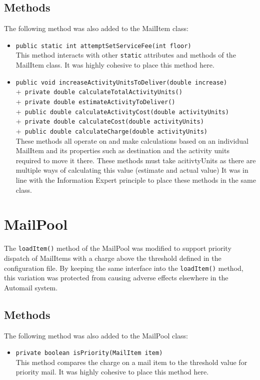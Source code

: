 \documentclass{article}
\begin{document}
\subsection{Methods}
The following method was also added to the MailItem class:
\begin{itemize}
    \item \verb|public static int attemptSetServiceFee(int floor)|\\[2mm]
    This method interacts with other \verb|static| attributes and methods of the MailItem class. It was highly cohesive to place this method here.
    \item \verb|public void increaseActivityUnitsToDeliver(double increase)|\\
    +\verb| private double calculateTotalActivityUnits()|\\
    +\verb| private double estimateActivityToDeliver()|\\
    +\verb| public double calculateActivityCost(double activityUnits)|\\
    +\verb| private double calculateCost(double activityUnits)|\\
    +\verb| public double calculateCharge(double activityUnits)|\\[2mm]
    These methods all operate on and make calculations based on an individual MailItem and its properties such as destination and the activity units required to move it there. These methods must take acitivtyUnits as there are multiple ways of calculating this value (estimate and actual value) It was in line with the Information Expert principle to place these methods in the same class.
\end{itemize}

\section{MailPool}
The \verb|loadItem()| method of the MailPool was modified to support priority dispatch of MailItems with a charge above the threshold defined in the configuration file. By keeping the same interface into the \verb|loadItem()| method, this variation was protected from causing adverse effects elsewhere in the Automail system.
\subsection{Methods}
The following method was also added to the MailPool class:
\begin{itemize}
    \item \verb|private boolean isPriority(MailItem item)|\\[2mm]
    This method compares the charge on a mail item to the threshold value for priority mail. It was highly cohesive to place this method here.
\end{itemize}
\end{document}
